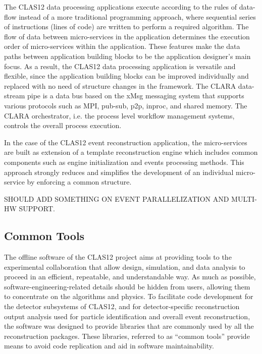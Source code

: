 The CLAS12 data processing applications execute according to the rules of data-flow instead of a more traditional
programming approach, where sequential series of instructions (lines of code) are written to perform a required algorithm. The flow of data between micro-services in the application determines
the execution order of micro-services within the application. These features make the data paths between application building blocks to be the application designer’s main focus. As a result, the CLAS12 data processing application is versatile and flexible, since
the application building blocks can be improved individually and replaced with no need of structure changes in the framework. 
The CLARA data-stream pipe is a data bus based on the xMsg messaging system that supports various protocols such as MPI, pub-sub, p2p, inproc, and shared memory. The CLARA orchestrator, i.e. the process level workflow management systems, controls the overall process execution. 

In the case of the CLAS12 event reconstruction application, the micro-services are built as extension of a template reconstruction engine which includes common components such as engine initialization and events processing methods. This approach strongly reduces and simplifies the development of an individual micro-service by enforcing a common structure. 

SHOULD ADD SOMETHING ON EVENT PARALLELIZATION AND MULTI-HW SUPPORT.

\subsection{Common Tools}
\label{common-tools}

The offline software of the CLAS12 project aims at providing tools to
the experimental collaboration that allow design, simulation, and data analysis to proceed
in an efficient, repeatable, and understandable way. As much as
possible, software-engineering-related details should be hidden from
users, allowing them to concentrate on the algorithms and physics.
To facilitate code development for the detector subsystems of CLAS12, and for detector-specific reconstruction output
analysis used for particle identification and overall event reconstruction,
the software was designed to provide libraries that are commonly used by all the reconstruction
packages.  These libraries, referred to as ``common tools'' provide means to avoid code replication and aid in software maintainability.

